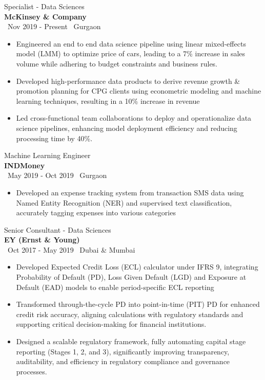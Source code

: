 \documentclass[a4paper,10pt]{article}
\begin{document}
{\large Specialist - Data Sciences} \\
\textbf{McKinsey \& Company} \\
\faCalendar \, Nov 2019 - Present \hfill \faMapMarker \, Gurgaon
\begin{itemize}[itemsep=1pt, topsep=0pt] %
    \item Engineered an end to end data science pipeline using linear mixed-effects model (LMM) to optimize price of cars, leading to a 7\% increase in sales volume while adhering to budget constraints and business rules.
    \item Developed  high-performance data products to derive revenue growth \& promotion planning for CPG clients using econometric modeling and machine learning techniques, resulting in a 10\% increase in revenue
    \item Led cross-functional team collaborations to deploy and operationalize data science pipelines, enhancing model deployment efficiency and reducing processing time by 40\%.

\end{itemize}

{\large Machine Learning Engineer} \\
\textbf{INDMoney} \\
\faCalendar \, May 2019 - Oct 2019 \hfill \faMapMarker \, Gurgaon
\begin{itemize}[itemsep=1pt, topsep=0pt]
    \item Developed an expense tracking system from transaction SMS data using Named Entity Recognition (NER) and supervised text classiﬁcation, accurately tagging expenses into various categories
\end{itemize}

{\large Senior Consultant - Data Sciences} \\
\textbf{EY (Ernst \& Young)} \\
\faCalendar \, Oct 2017 - May 2019 \hfill \faMapMarker \, Dubai \& Mumbai
\begin{itemize}[itemsep=1pt, topsep=0pt]
    \item Developed Expected Credit Loss (ECL) calculator under IFRS 9, integrating Probability of Default (PD), Loss Given Default (LGD) and Exposure at Default (EAD) models to enable period-specific ECL reporting
    \item Transformed through-the-cycle PD into point-in-time (PIT) PD for enhanced credit risk accuracy, aligning calculations with regulatory standards and supporting critical decision-making for financial institutions.
    \item Designed a scalable regulatory framework, fully automating capital stage reporting (Stages 1, 2, and 3), significantly improving transparency, auditability, and efficiency in regulatory compliance and governance processes.
\end{itemize}
\end{document}

